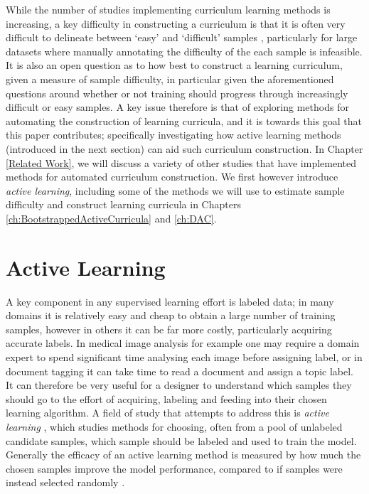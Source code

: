 While the number of studies implementing curriculum learning methods is increasing, a key difficulty in constructing a curriculum is that it is often very difficult to delineate between `easy' and `difficult' samples \cite{Bengio2009}, particularly for large datasets where manually annotating the difficulty of the each sample is infeasible. It is also an open question as to how best to construct a learning curriculum, given a measure of sample difficulty, in particular given the aforementioned questions around whether or not training should progress through increasingly difficult or easy samples. A key issue therefore is that of exploring methods for automating the construction of learning curricula, and it is towards this goal that this paper contributes; specifically investigating how active learning methods (introduced in the next section) can aid such curriculum construction. In Chapter \ref{Related Work}, we will discuss a variety of other studies that have implemented methods for automated curriculum construction. We first however introduce \textit{active learning}, including some of the methods we will use to estimate sample difficulty and construct learning curricula in Chapters \ref{ch:BootstrappedActiveCurricula} and \ref{ch:DAC}.


\section{Active Learning}\label{Background_ActiveLearning}
A key component in any supervised learning effort is labeled data; in many domains it is relatively easy and cheap to obtain a large number of training samples, however in others it can be far more costly, particularly acquiring accurate labels. In medical image analysis for example one may require a domain expert to spend significant time analysing each image before assigning label, or in document tagging it can take time to read a document and assign a topic label. It can therefore be very useful for a designer to understand which samples they should go to the effort of acquiring, labeling and feeding into their chosen learning algorithm. A field of study that attempts to address this is \textit{active learning} \cite{settles2012active} \cite{cohn1994improving} \cite{cohn1996active}, which studies methods for choosing, often from a pool of unlabeled candidate samples, which sample should be labeled and used to train the model. Generally the efficacy of an active learning method is measured by how much the chosen samples improve the model performance, compared to if samples were instead selected randomly \cite{settles2012active}.

